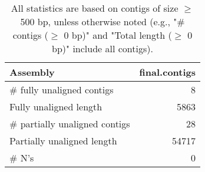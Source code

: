 \documentclass[12pt,a4paper]{article}
\begin{document}
\begin{table}[ht]
\begin{center}
\caption{All statistics are based on contigs of size $\geq$ 500 bp, unless otherwise noted (e.g., "\# contigs ($\geq$ 0 bp)" and "Total length ($\geq$ 0 bp)" include all contigs).}
\begin{tabular}{|l*{1}{|r}|}
\hline
Assembly & final.contigs \\ \hline
\# fully unaligned contigs & 8 \\ \hline
Fully unaligned length & 5863 \\ \hline
\# partially unaligned contigs & 28 \\ \hline
Partially unaligned length & 54717 \\ \hline
\# N's & 0 \\ \hline
\end{tabular}
\end{center}
\end{table}
\end{document}
